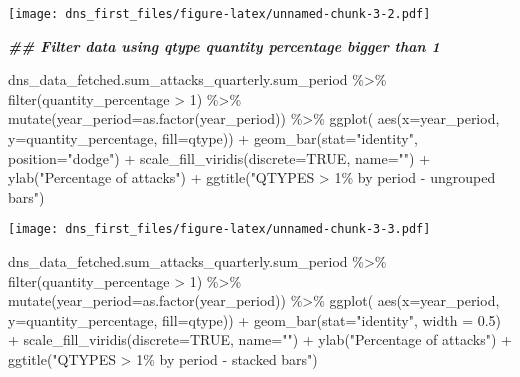 \documentclass[
]{article}
\newenvironment{Shaded}{\begin{snugshade}}{\end{snugshade}}
\newcommand{\AttributeTok}[1]{\textcolor[rgb]{0.77,0.63,0.00}{#1}}
\newcommand{\ConstantTok}[1]{\textcolor[rgb]{0.00,0.00,0.00}{#1}}
\newcommand{\DecValTok}[1]{\textcolor[rgb]{0.00,0.00,0.81}{#1}}
\newcommand{\DocumentationTok}[1]{\textcolor[rgb]{0.56,0.35,0.01}{\textbf{\textit{#1}}}}
\newcommand{\FloatTok}[1]{\textcolor[rgb]{0.00,0.00,0.81}{#1}}
\newcommand{\FunctionTok}[1]{\textcolor[rgb]{0.00,0.00,0.00}{#1}}
\newcommand{\NormalTok}[1]{#1}
\newcommand{\SpecialCharTok}[1]{\textcolor[rgb]{0.00,0.00,0.00}{#1}}
\newcommand{\StringTok}[1]{\textcolor[rgb]{0.31,0.60,0.02}{#1}}
\begin{document}
\texttt{[image: dns\_first\_files/figure-latex/unnamed-chunk-3-2.pdf]}

\begin{Shaded}
\begin{Highlighting}[]
\DocumentationTok{\#\# Filter data using qtype quantity percentage bigger than 1}

\NormalTok{dns\_data\_fetched.sum\_attacks\_quarterly.sum\_period }\SpecialCharTok{\%\textgreater{}\%}
  \FunctionTok{filter}\NormalTok{(quantity\_percentage }\SpecialCharTok{\textgreater{}} \DecValTok{1}\NormalTok{) }\SpecialCharTok{\%\textgreater{}\%}
  \FunctionTok{mutate}\NormalTok{(}\AttributeTok{year\_period=}\FunctionTok{as.factor}\NormalTok{(year\_period)) }\SpecialCharTok{\%\textgreater{}\%}
  \FunctionTok{ggplot}\NormalTok{( }\FunctionTok{aes}\NormalTok{(}\AttributeTok{x=}\NormalTok{year\_period, }\AttributeTok{y=}\NormalTok{quantity\_percentage, }\AttributeTok{fill=}\NormalTok{qtype)) }\SpecialCharTok{+}
    \FunctionTok{geom\_bar}\NormalTok{(}\AttributeTok{stat=}\StringTok{"identity"}\NormalTok{, }\AttributeTok{position=}\StringTok{"dodge"}\NormalTok{) }\SpecialCharTok{+}
    \FunctionTok{scale\_fill\_viridis}\NormalTok{(}\AttributeTok{discrete=}\ConstantTok{TRUE}\NormalTok{, }\AttributeTok{name=}\StringTok{""}\NormalTok{) }\SpecialCharTok{+}
    \FunctionTok{ylab}\NormalTok{(}\StringTok{"Percentage of attacks"}\NormalTok{) }\SpecialCharTok{+}
    \FunctionTok{ggtitle}\NormalTok{(}\StringTok{"QTYPES \textgreater{} 1\% by period {-} ungrouped bars"}\NormalTok{)}
\end{Highlighting}
\end{Shaded}

\texttt{[image: dns\_first\_files/figure-latex/unnamed-chunk-3-3.pdf]}

\begin{Shaded}
\begin{Highlighting}[]
\NormalTok{dns\_data\_fetched.sum\_attacks\_quarterly.sum\_period }\SpecialCharTok{\%\textgreater{}\%}
  \FunctionTok{filter}\NormalTok{(quantity\_percentage }\SpecialCharTok{\textgreater{}} \DecValTok{1}\NormalTok{) }\SpecialCharTok{\%\textgreater{}\%}
  \FunctionTok{mutate}\NormalTok{(}\AttributeTok{year\_period=}\FunctionTok{as.factor}\NormalTok{(year\_period)) }\SpecialCharTok{\%\textgreater{}\%}
  \FunctionTok{ggplot}\NormalTok{( }\FunctionTok{aes}\NormalTok{(}\AttributeTok{x=}\NormalTok{year\_period, }\AttributeTok{y=}\NormalTok{quantity\_percentage, }\AttributeTok{fill=}\NormalTok{qtype)) }\SpecialCharTok{+}
    \FunctionTok{geom\_bar}\NormalTok{(}\AttributeTok{stat=}\StringTok{"identity"}\NormalTok{, }\AttributeTok{width =} \FloatTok{0.5}\NormalTok{) }\SpecialCharTok{+}
    \FunctionTok{scale\_fill\_viridis}\NormalTok{(}\AttributeTok{discrete=}\ConstantTok{TRUE}\NormalTok{, }\AttributeTok{name=}\StringTok{""}\NormalTok{) }\SpecialCharTok{+}
    \FunctionTok{ylab}\NormalTok{(}\StringTok{"Percentage of attacks"}\NormalTok{) }\SpecialCharTok{+}
    \FunctionTok{ggtitle}\NormalTok{(}\StringTok{"QTYPES \textgreater{} 1\% by period {-} stacked bars"}\NormalTok{)}
\end{Highlighting}
\end{Shaded}
\end{document}
